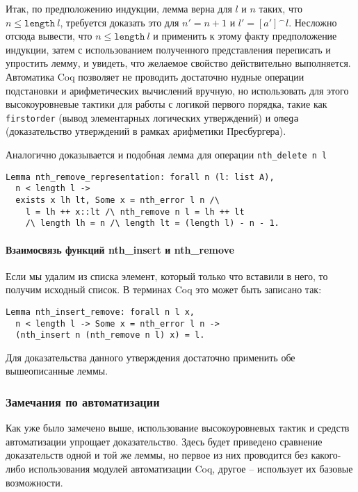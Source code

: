 Итак, по предположению индукции, лемма верна для $l$ и $n$ таких, что $n \leq \texttt{length}\ l$, требуется доказать это для $n' = n + 1$ и $l' = [a']^\frown l$. Несложно отсюда вывести, что $n \leq \texttt{length}\ l$ и применить к этому факту предположение индукции, затем с использованием полученного представления переписать и упростить лемму, и увидеть, что желаемое свойство действительно выполняется. Автоматика Coq позволяет не проводить достаточно нудные операции подстановки и арифметических вычислений вручную, но использовать для этого высокоуровневые тактики для работы с логикой первого порядка, такие как \texttt{firstorder} (вывод элементарных логических утверждений) и \texttt{omega} (доказательство утверждений в рамках арифметики Пресбургера).

Аналогично доказывается и подобная лемма для операции \texttt{nth\_delete n l}
\begin{lstlisting}
Lemma nth_remove_representation: forall n (l: list A),
  n < length l ->
  exists x lh lt, Some x = nth_error l n /\
    l = lh ++ x::lt /\ nth_remove n l = lh ++ lt
    /\ length lh = n /\ length lt = (length l) - n - 1.
\end{lstlisting}

\paragraph{Взаимосвязь функций nth\_insert и nth\_remove} Если мы удалим из списка элемент, который только что вставили в него, то получим исходный список. В терминах Coq это может быть записано так:
\begin{lstlisting}
Lemma nth_insert_remove: forall n l x,
  n < length l -> Some x = nth_error l n ->
  (nth_insert n (nth_remove n l) x) = l.
\end{lstlisting}

Для доказательства данного утверждения достаточно применить обе вышеописанные леммы.

\subsubsection{Замечания по автоматизации}

Как уже было замечено выше, использование высокоуровневых тактик и средств автоматизации упрощает доказательство. Здесь будет приведено сравнение доказательств одной и той же леммы, но первое из них проводится без какого-либо использования модулей автоматизации Coq, другое -- использует их базовые возможности.

